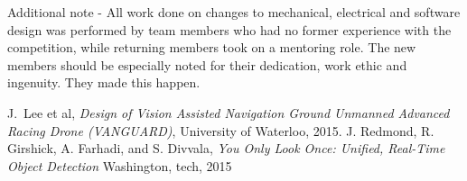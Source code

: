 \documentclass[11pt,journal]{IEEEtran}
\begin{document}
Additional note - All work done on changes to mechanical, electrical and software design was performed by team members who had no former experience with the competition, while returning members took on a mentoring role. The new members should be especially noted for their dedication, work ethic and ingenuity. They made this happen.

\ifCLASSOPTIONcaptionsoff
  \newpage
\fi





%
%
%
\begin{thebibliography}{1}

J.~Lee et al, \emph{Design of Vision Assisted Navigation Ground Unmanned Advanced Racing Drone (VANGUARD)}, University of Waterloo, 2015.
J. Redmond, R. Girshick, A. Farhadi, and S. Divvala, \emph{You Only Look Once: Unified, Real-Time Object Detection} Washington, tech, 2015


\end{thebibliography}

% 
\end{document}
